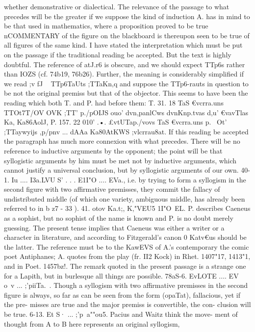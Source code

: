 {{{{{{{{{{{whether demonstrative or dialectical.
The relevance of the passage to what precedes will be the
greater if we suppose the kind of induction A. has in mind to be
that used in mathematics, where a proposition proved to be true
nCOMMENTARY
of the figure on the blackboard is thereupon seen to be true of all
figures of the same kind.
I have stated the interpretation which must be put on the
passage if the traditional reading be accepted. But the text
is highly doubtful. The reference of atJ.r6 is obscure, and we should
expect TTp6s rather than IOZS (cf. 74b19, 76b26). Further, the meaning
is considerably simplified if we read ;v fJ ~ TTp6TaUts ;TTaKn,q and
suppose the TTp6-rauts in question to be not the original premiss but
that of the objector. This seems to have been the reading which
both T. and P. had before them: T. 31. 18 TaS €vcrra.uns TTOt7}T/OV
OVK ;TT' p./pOIJS ouo' dvn,panlCws dvnKnp.tvas d,u' €vavTlas Ka,
Ka86AolJ, P. 157. 22 010' .•. £vtUTap./vovs TaS €vcrra.uns p.~ Ot' ;TTaywyijs
,p/pnv ... dAAa Ka80AtKWS ;vlcrrau8at.
If this reading be accepted the paragraph has much more
connexion with what precedes. There will be no reference to
inductive arguments by the opponent; the point will be that
syllogistic arguments by him must be met not by inductive
arguments, which cannot justify a universal conclusion, but by
syllogistic arguments of our own.
40-1. Iu .... I3a.LVU S' . . . E1I"O .... EVa., i.e. by trying to form a
syllogism in the second figure with two affirmative premisses,
they commit the fallacy of undistributed middle (of which one
variety, ambiguous middle, has already been referred to in
b z7 -
33 ).
41. otov Ka.t;, K,"VEU5 1I"O~EL. P. describes Caeneus as a sophist,
but no sophist of the name is known and P. is no doubt merely
guessing. The present tense implies that Caeneus was either a
writer or a character in literature, and according to Fitzgerald's
canon 0 Katv€us should be the latter. The reference must be to
the KawEVS of A.'s contemporary the comic poet Antiphanes;
A. quotes from the play (fr. II2 Kock) in Rhet. 1407"17, 1413"1,
and in Poet. 1457bz!. The remark quoted in the present passage
is a strange one for a Lapith, but in burlesque all things are
possible.
78aS-6. EvLOTE .... EV o~v ... ;'piiTa.~. Though a syllogism with
two affirmative premisses in the second figure is always, so far
as can be seen from the form (opaTat), fallacious, yet if the pre-
misses are true and the major premiss is convertible, the con-
clusion will be true.
6-13. Et S· ... ;'p~a""ou5. Pacius and Waitz think the move-
ment of thought from A to B here represents an original syllogism,
}}}}}}}}}}
